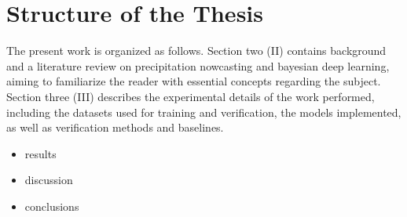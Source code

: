 \section{Structure of the Thesis}

The present work is organized as follows. Section two (II) contains background and a literature review on precipitation nowcasting and bayesian deep learning, aiming to familiarize the reader with essential concepts regarding the subject. Section three (III) describes the experimental details of the work performed, including the datasets used for training and verification, the models implemented, as well as verification methods and baselines. 

\begin{itemize}
	\item results
	\item discussion
	\item conclusions
\end{itemize}
\label{section:structure} 


